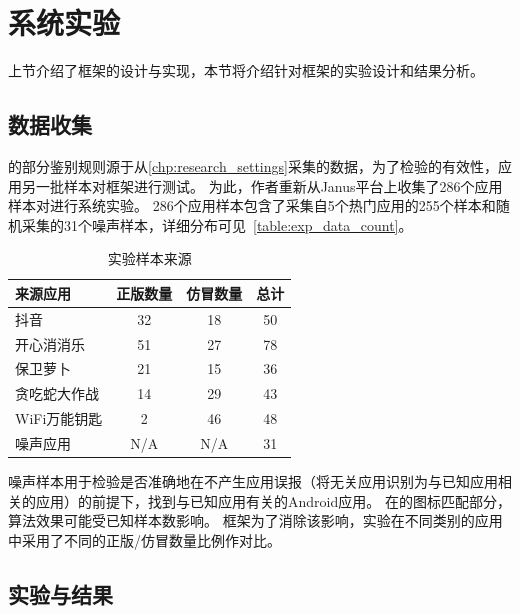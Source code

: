\section{系统实验}

上节介绍了框架的设计与实现，本节将介绍针对框架的实验设计和结果分析。

\subsection{数据收集}

\mytool 的部分鉴别规则源于从\autoref{chp:research_settings}采集的数据，为了检验\mytool 的有效性，应用另一批样本对框架进行测试。
为此，作者重新从Janus平台上收集了286个应用样本对\mytool 进行系统实验。
286个应用样本包含了采集自5个热门应用的255个样本和随机采集的31个噪声样本，详细分布可见~\autoref{table:exp_data_count}。

\begin{table}[htbp]
    \renewcommand{\arraystretch}{1}
    \footnotesize
    \centering
    \caption{\mytool 实验样本来源}
    \vspace{1mm}
    \begin{tabular}{l ccc}
        \toprule
        {\bf 来源应用} & {\bf 正版数量} & {\bf 仿冒数量} & {\bf 总计} \\
        \midrule
        抖音           & 32             & 18             & 50         \\
        开心消消乐     & 51             & 27             & 78         \\
        保卫萝卜       & 21             & 15             & 36         \\
        贪吃蛇大作战   & 14             & 29             & 43         \\
        WiFi万能钥匙   & 2              & 46             & 48         \\
        噪声应用       & N/A            & N/A            & 31         \\
        \bottomrule
    \end{tabular}
    \label{table:exp_data_count}
\end{table}

噪声样本用于检验\mytool 是否准确地在不产生应用误报（将无关应用识别为与已知应用相关的应用）的前提下，找到与已知应用有关的Android应用。
在\componentA 的图标匹配部分，算法效果可能受已知样本数影响。
框架为了消除该影响，实验在不同类别的应用中采用了不同的正版/仿冒数量比例作对比。

\subsection{实验与结果}

